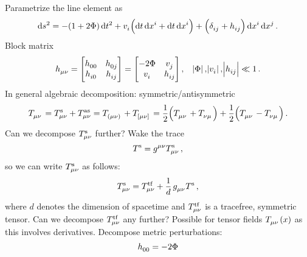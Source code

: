 Parametrize the line element as
\begin{equation}
    \dif s^2 = - \left(1+2\Phi\right)\dif t^2 + \tensor{v}{_i} \left(\dif t \dif \tensor{x}{^i} + \dif t \dif \tensor{x}{^i}\right) + \left(\tensor{\delta}{_{ij}} + \tensor{h}{_{ij}} \right)\dif \tensor{x}{^i}\dif \tensor{x}{^j}\,.
\end{equation}
Block matrix
\begin{equation}
    \tensor{h}{_{\mu\nu}} =
    \begin{bmatrix}
        \tensor{h}{_{00}} & \tensor{h}{_{0j}} \\
        \tensor{h}{_{i0}} & \tensor{h}{_{ij}}
    \end{bmatrix}
    =
    \begin{bmatrix}
        -2\Phi & \tensor{v}{_{j}} \\
        \tensor{v}{_{i}} & \tensor{h}{_{ij}}
    \end{bmatrix}
    \, , \quad \abs{\Phi},\abs{\tensor{v}{_i}},\abs{\tensor{h}{_{ij}}} \ll 1\,.
\end{equation}
In general algebraic decomposition: symmetric/antisymmetric
\begin{equation}
    \tensor{T}{_{\mu\nu}} = \tensor*{T}{_{\mu\nu}^{\text{s}}} + \tensor*{T}{_{\mu\nu}^{\text{as}}} = \tensor{T}{_{(\mu\nu)}} + \tensor{T}{_{[\mu\nu]}} = \frac{1}{2}\left(\tensor{T}{_{\mu\nu}}+\tensor{T}{_{\nu\mu}}\right) + \frac{1}{2}\left(\tensor{T}{_{\mu\nu}}-\tensor{T}{_{\nu\mu}}\right)\,.
\end{equation}
Can we decompose $\tensor*{T}{_{\mu\nu}^{\text{s}}}$ further?\newline
Wake the trace
\begin{equation}
    \tensor{T}{^{\text{s}}} = \tensor{g}{^{\mu\nu}}\tensor*{T}{_{\mu\nu}^{\text{s}}}\, ,
\end{equation}
so we can write $\tensor*{T}{_{\mu\nu}^{\text{s}}}$ as follows:
\begin{equation}
    \tensor*{T}{_{\mu\nu}^{\text{s}}} = \tensor*{T}{_{\mu\nu}^{\text{tf}}} + \frac{1}{d}\,\tensor{g}{_{\mu\nu}}\tensor{T}{^{\text{s}}}\,,
\end{equation}
where $d$ denotes the dimension of spacetime and $\tensor*{T}{_{\mu\nu}^{\text{tf}}}$ is a tracefree, symmetric tensor.
Can we decompose $\tensor*{T}{_{\mu\nu}^{\text{tf}}}$ any further? Possible for tensor fields $\tensor{T}{_{\mu\nu}}(x)$ as this involves derivatives.
Decompose metric perturbations:
\begin{equation}
    \tensor{h}{_{00}} = -2\Phi
\end{equation}
